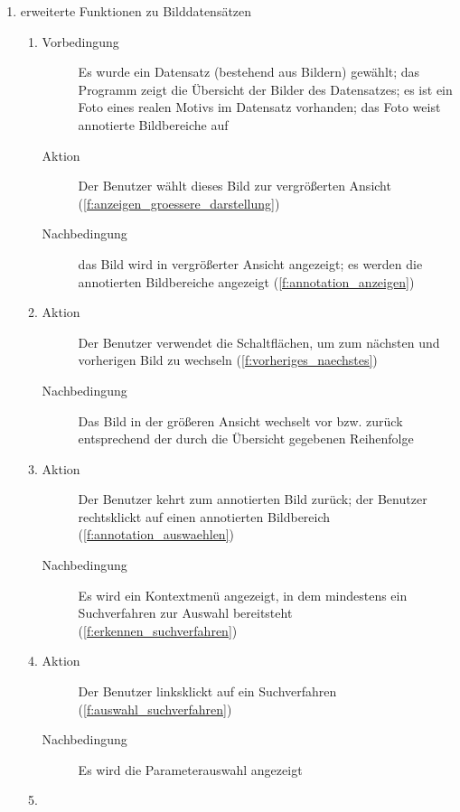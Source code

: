 \begin{enumerate} [label=\bfseries /TS \arabic*0/, leftmargin=*]
	\item erweiterte Funktionen zu Bilddatensätzen \label{ts:erweiterte_Funktionen_zu_Bilddatensätzen}
	\begin{enumerate}[leftmargin=0pt]
		\item
		\begin{description}
			\item[Vorbedingung] Es wurde ein Datensatz (bestehend aus Bildern) gewählt; das Programm zeigt die Übersicht der Bilder des Datensatzes; es ist ein Foto eines realen Motivs im Datensatz vorhanden; das Foto weist annotierte Bildbereiche auf
			\item[Aktion] Der Benutzer wählt dieses Bild zur vergrößerten Ansicht (\ref{f:anzeigen_groessere_darstellung})
			\item[Nachbedingung] das Bild wird in vergrößerter Ansicht angezeigt; es werden die annotierten Bildbereiche angezeigt (\ref{f:annotation_anzeigen})
		\end{description}
		\item
		\begin{description}
			\item[Aktion] Der Benutzer verwendet die Schaltflächen, um zum nächsten und vorherigen Bild zu wechseln (\ref{f:vorheriges_naechstes})
			\item[Nachbedingung] Das Bild in der größeren Ansicht wechselt vor bzw. zurück entsprechend der durch die Übersicht gegebenen Reihenfolge
		\end{description}
		\item
		\begin{description}
			\item[Aktion] Der Benutzer kehrt zum annotierten Bild zurück; der Benutzer rechtsklickt auf einen annotierten Bildbereich (\ref{f:annotation_auswaehlen})
			\item[Nachbedingung] Es wird ein Kontextmenü angezeigt, in dem mindestens ein Suchverfahren zur Auswahl bereitsteht (\ref{f:erkennen_suchverfahren})
		\end{description}
		\item
		\begin{description}
			\item[Aktion] Der Benutzer linksklickt auf ein Suchverfahren (\ref{f:auswahl_suchverfahren})
			\item[Nachbedingung] Es wird die Parameterauswahl angezeigt
		\end{description}
		\item
		\begin{description}

\end{description}
\end{enumerate}
\end{enumerate}
